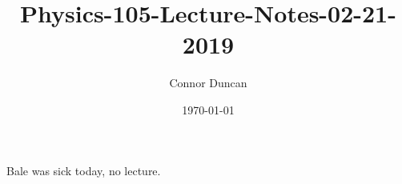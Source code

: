 \documentclass{article}
\author{Connor Duncan}
\date{\today}
\title{Physics-105-Lecture-Notes-02-21-2019}
\theoremstyle{definition}
\begin{document}
\maketitle
Bale was sick today, no lecture.
\end{document}
